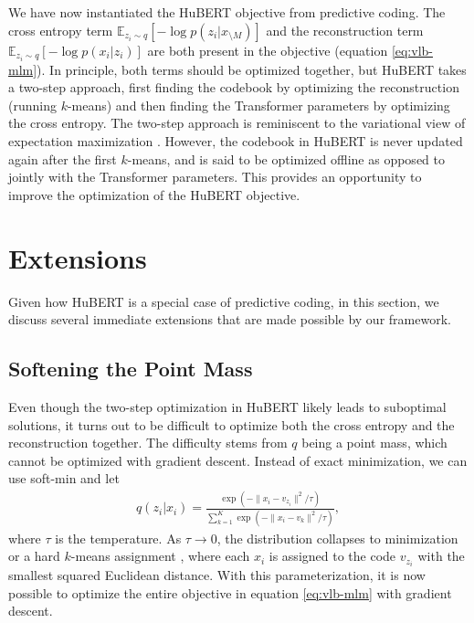 We have now instantiated the HuBERT objective from predictive coding.
The cross entropy term $\mathbb{E}_{z_i \sim q}[-\log p(z_i | x_{\setminus M})]$ and the reconstruction term $\mathbb{E}_{z_i \sim q}[-\log p(x_i | z_i)]$ are both present in the objective (equation \ref{eq:vlb-mlm}).
In principle, both terms should be optimized together,
but HuBERT takes a two-step approach, first finding the codebook by optimizing
the reconstruction (running $k$-means)
and then finding the Transformer parameters by optimizing the cross entropy.
The two-step approach is reminiscent to the variational view of expectation maximization \citep{neal1998view,attias1999variational}.
However, the codebook in HuBERT is never updated again after the first $k$-means,
and is said to be optimized offline as opposed to jointly with the Transformer
parameters.
This provides an opportunity to improve the optimization of the HuBERT objective.

\section{Extensions}
\label{sec:extensions}

%
Given how HuBERT is a special case of predictive coding, in this section, we discuss several immediate extensions that are made possible by our framework.

\subsection{Softening the Point Mass}

Even though the two-step optimization in HuBERT likely leads to suboptimal solutions, it turns out to be difficult to optimize both the cross entropy and the reconstruction together.
The difficulty stems from $q$ being a point mass, which cannot be optimized with gradient descent.
Instead of exact minimization, we can use soft-min and let
\begin{align}
q(z_i|x_i) = \frac{\exp\left(-\|x_i - v_{z_i}\|^2 / \tau\right)}
  {\sum_{k=1}^{K} \exp\left(-\|x_i - v_k\|^2 / \tau\right)},
  \label{eq:softmax-q}
\end{align}
where $\tau$ is the temperature.
As $\tau \to 0$, the distribution collapses to minimization or a hard $k$-means assignment \citep{Kulis2011RevisitingKN}, where each $x_i$ is assigned to the code $v_{z_i}$ with the smallest squared Euclidean distance.
With this parameterization, it is now possible to optimize the entire objective in equation \ref{eq:vlb-mlm} with gradient descent.
%

